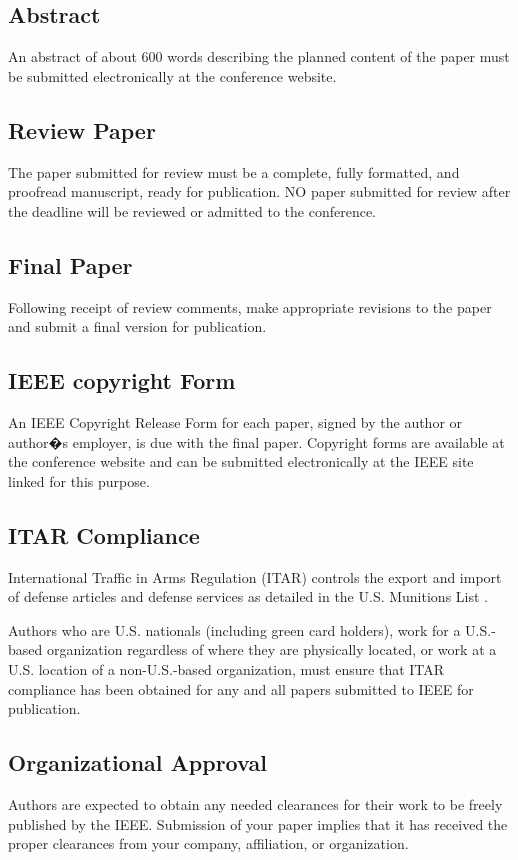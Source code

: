 \documentclass[twocolumn,letterpaper]{IEEEAerospaceCLS}  %
\begin{document}
\subsection{Abstract}
An abstract of about 600 words describing the planned content of the paper must be submitted electronically at the conference website.

\subsection{Review Paper}
The paper submitted for review must be a complete, fully formatted, and proofread manuscript, ready for publication. NO paper submitted for review after the deadline will be reviewed or admitted to the conference.

\subsection{Final Paper}
Following receipt of review comments, make appropriate revisions to the paper and submit a final version for publication.

\subsection{IEEE copyright Form}
An IEEE Copyright Release Form for each paper, signed by the author or author�s employer, is due with the final paper. Copyright forms are available at the conference website and can be submitted electronically at the IEEE site linked for this purpose.

\subsection{ITAR Compliance}
International Traffic in Arms Regulation (ITAR) controls the export and import of defense articles and defense services as detailed in the U.S. Munitions List \cite{ITAR}.

Authors who are U.S. nationals (including green card holders), work for a U.S.-based organization regardless of where they are physically located, or work at a U.S. location of a non-U.S.-based organization, must ensure that ITAR compliance has been obtained for any and all papers submitted to IEEE for publication.

\subsection{Organizational Approval}
Authors are expected to obtain any needed clearances for their work to be freely published by the IEEE. Submission of your paper implies that it has received the proper clearances from your company, affiliation, or organization.
\end{document}

